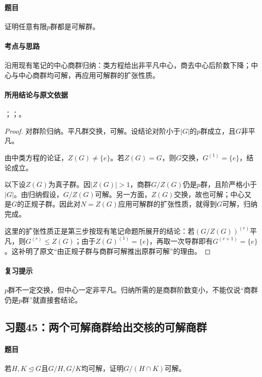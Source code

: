 \paragraph{题目}
证明任意有限$p$群都是可解群。

\paragraph{考点与思路}
沿用现有笔记的中心商群归纳：类方程给出非平凡中心，商去中心后阶数下降；中心与中心商群均可解，再应用可解群的扩张性质。

\paragraph{所用结论与原文依据}
；；。


\begin{proof}
对群阶归纳。平凡群交换，可解。设结论对阶小于$|G|$的$p$群成立，且$G$非平凡。

由中类方程的论证，$Z(G)\ne\{e\}$。若$Z(G)=G$，则$G$交换，$G^{(1)}=\{e\}$，结论成立。

以下设$Z(G)$为真子群。因$|Z(G)|>1$，商群$G/Z(G)$仍是$p$群，且阶严格小于$|G|$。由归纳假设，$G/Z(G)$可解。另一方面，$Z(G)$交换，故也可解；中心又是$G$的正规子群。因此对$N=Z(G)$应用可解群的扩张性质，就得到$G$可解，归纳完成。

这里的扩张性质正是第三步按现有笔记命题所展开的结论：若$(G/Z(G))^{(r)}$平凡，则$G^{(r)}\le Z(G)$；由于$Z(G)^{(1)}=\{e\}$，再取一次导群即有$G^{(r+1)}=\{e\}$。这补明了原文“由正规子群与商群可解推出原群可解”的理由。
\end{proof}

\paragraph{复习提示}
$p$群不一定交换，但中心一定非平凡。归纳所需的是商群阶数变小，不能仅说“商群仍是$p$群”就直接套结论。


\subsection{习题45：\texorpdfstring{两个可解商群给出交核的可解商群}{两个可解商群给出交核的可解商群}}
\label{ex:2:45}

\paragraph{题目}
若$H,K\trianglelefteq G$且$G/H,G/K$均可解，证明$G/(H\cap K)$可解。

